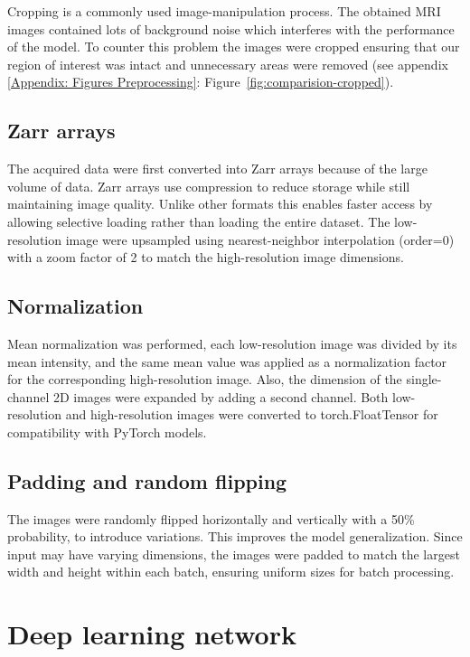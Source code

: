 \documentclass[twocolumn]{article}
\begin{document}
Cropping is a commonly used image-manipulation process. The obtained MRI images contained lots of background noise which interferes with the performance of the model. 
To counter this problem the images were cropped ensuring that our region of interest was intact and unnecessary areas were removed (see appendix \ref{Appendix: Figures Preprocessing}: Figure~\ref{fig:comparision-cropped}).  



\subsection{Zarr arrays}

The acquired data were first converted into Zarr arrays because of the large volume of data. Zarr arrays use compression to reduce storage while still maintaining image quality. 
Unlike other formats this enables faster access by allowing selective loading rather than loading the entire dataset. 
The low-resolution image were upsampled using nearest-neighbor interpolation (order=0) with a zoom factor of 2 to match the high-resolution image dimensions. 

\subsection{Normalization}

Mean normalization was performed, each low-resolution image was divided by its mean intensity, and the same mean value was applied as a normalization factor for the corresponding high-resolution image.  
Also, the dimension of the single-channel 2D images were expanded by adding a second channel. Both low-resolution and high-resolution images were converted to torch.FloatTensor for compatibility with PyTorch models.

\subsection{Padding and random flipping}
The images were randomly flipped horizontally and vertically with a 50\% probability, to introduce variations. 
This improves the model generalization. Since input may have varying dimensions, the images were padded to match the largest width and height within each batch, ensuring uniform sizes for batch processing.


\section{Deep learning network}
\end{document}
